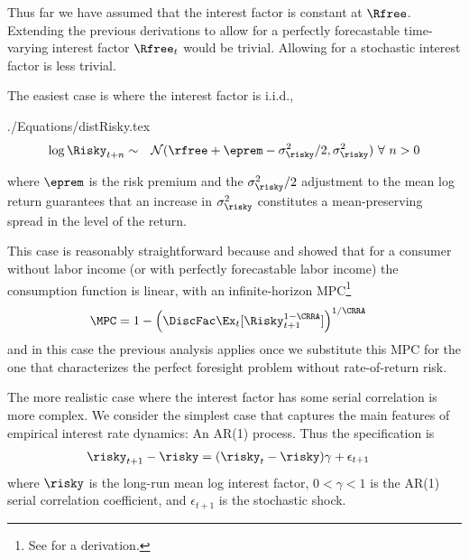 \documentclass[titlepage, headings=optiontotocandhead]{\econtex}
\begin{document}
Thus far we have assumed that the interest factor is constant at $\Rfree$.  Extending the
previous derivations to allow for a perfectly forecastable time-varying interest factor $\Rfree_{t}$ 
would be trivial.  Allowing for a stochastic interest factor is less trivial.  


The easiest case is where the interest factor is i.i.d.,
\begin{verbatimwrite}{./Equations/distRisky.tex}
  \begin{equation}\begin{gathered}\begin{aligned}
        \log \Risky_{t+n} & \sim & \mathcal{N}(\rfree + \eprem - \sigma^{2}_{\risky}/2,\sigma^{2}_{\risky}) ~\forall~n>0 \label{eq:distRisky}
      \end{aligned}\end{gathered}\end{equation}
\end{verbatimwrite}
\unskip

where $\eprem$ is the risk premium and the $\sigma^{2}_{\risky}/2$ adjustment to the mean log return
guarantees that an increase in $\sigma^{2}_{\risky}$ constitutes a mean-preserving spread in the level of the return.  

This case is reasonably straightforward because \cite{merton:restat} and \cite{samuelson:portfolio} showed
that for a consumer without labor income (or with perfectly forecastable labor income) the consumption
function is linear, with an infinite-horizon MPC\footnote{See  for a derivation.}
\begin{equation}\begin{gathered}\begin{aligned}
      \MPC  & = 1- \left(\DiscFac  \Ex_{t}[\Risky_{t+1}^{1-\CRRA}]\right)^{1/\CRRA} \label{eq:MPCExact}
    \end{aligned}\end{gathered}\end{equation}
and in this case the previous analysis applies once we substitute this MPC for the one that characterizes 
the perfect foresight problem without rate-of-return risk.  

The more realistic case where the interest factor has some serial correlation is more complex.  We consider 
the simplest case that captures the main features of empirical interest rate dynamics: An AR(1) process.  Thus
the specification is 
\begin{equation}\begin{gathered}\begin{aligned}
      \risky_{t+1}-\risky  & = (\risky_{t}-\risky) \gamma + \epsilon_{t+1} 
    \end{aligned}\end{gathered}\end{equation}
where $\risky$ is the long-run mean log interest factor, $0 < \gamma < 1$ is the AR(1) serial correlation
coefficient, and $\epsilon_{t+1}$ is the stochastic shock.  
\end{document}
